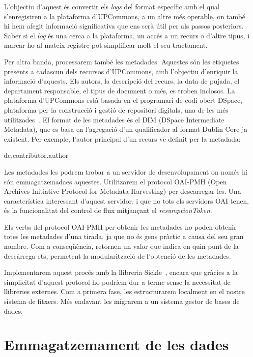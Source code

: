 \documentclass[lettersize,journal]{IEEEtran}
\begin{document}
L'objectiu d'aquest és convertir els \textit{logs} del format específic amb el qual s'enregistren a la plataforma d'UPCommons, a un altre més operable, on també hi hem afegit informació significativa que ens serà útil per als passos posteriors.
Saber si el \textit{log} és una cerca a la plataforma, un accés a un recurs o d'altre tipus, i marcar-ho al mateix registre pot simplificar molt el seu tractament.

Per altra banda, processarem també les metadades.
Aquestes són les etiquetes presents a cadascun dels recursos d'UPCommons, amb l'objectiu d'enriquir la informació d'aquests.
Els autors, la descripció del recurs, la data de pujada, el departament responsable, el tipus de document o més, es troben inclosos.
La plataforma d'UPCommons està basada en el programari de codi obert DSpace, plataforma per la construcció i gestió de repositori digitals, una de les més utilitzades~\cite{eprints:roar}.
El format de les metadades és el DIM (DSpace Intermediate Metadata), que es basa en l'agregació d'un qualificador al format Dublin Core ja existent.
Per exemple, l'autor principal d'un recurs ve definit per la metadada:
\begin{center}
    {dc.contributor.author}
\end{center}

Les metadades les podrem trobar a un servidor de desenvolupament on només hi són emmagatzemadaes aquestes.
Utilitzarem el protocol OAI-PMH (Open Archives Initiative Protocol for Metadata Harvesting) per descarregar-les.
Una característica interessant d'aquest servidor, i que no tots els servidors OAI tenen, és la funcionalitat del control de flux mitjançant el \textit{resumptionToken}.

Els verbs del protocol OAI-PMH per obtenir les metadades no poden obtenir totes les metadades d'una tirada, ja que no és gens pràctic a causa del seu gran nombre.
Com a conseqüència, retornen un valor que indica en quin punt de la descàrrega ets, permetent la modularització de l'obtenció de les metadades.

Implementarem aquest procés amb la llibreria Sickle~\cite{Sickle}, encara que gràcies a la simplicitat d'aquest protocol ho podríem dur a terme sense la necessitat de llibreries externes.
Com a primera fase, les estructurarem localment en el nostre sistema de fitxers.
Més endavant les migrarem a un sistema gestor de bases de dades.


\section{Emmagatzemament de les dades}\label{sec:data-storing}
\end{document}
